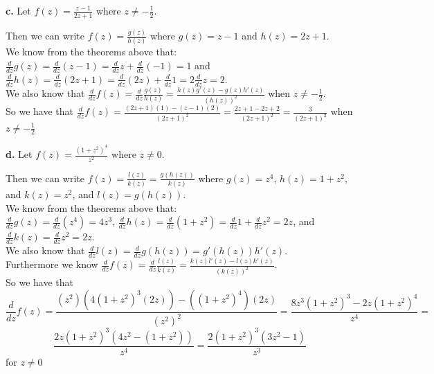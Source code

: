 \documentclass{article}
\begin{document}
{\Large\textbf{c.}} Let $f(z) =\frac{z - 1}{2z + 1}$ where $z\neq -\frac{1}{2}$.
\begin{center}
    \doublespacing
    Then we can write $f(z) =\frac{g(z)}{h(z)}$ where $g(z) = z - 1$ and $h(z) = 2z + 1$.
    \\We know from the theorems above that:
    \\$\frac{d}{dz} g(z) =\frac{d}{dz} (z - 1) =\frac{d}{dz} z +\frac{d}{dz} (-1) = 1$ and $\frac{d}{dz} h(z) =\frac{d}{dz} (2z + 1) =\frac{d}{dz} (2z) +\frac{d}{dz} 1 = 2\frac{d}{dz} z = 2$.
    \\We also know that $\frac{d}{dz} f(z) =\frac{d}{dz}\frac{g(z)}{h(z)} =\frac{h(z) g'(z) - g(z) h'(z)}{(h(z))^2}$ when $z\neq -\frac{1}{2}$.
    \\So we have that $\frac{d}{dz} f(z) =\frac{(2z + 1)(1) - (z - 1)(2)}{(2z + 1)^2} =\frac{2z + 1 - 2z + 2}{(2z + 1)^2} =\frac{3}{(2z + 1)^2}$ when $z\neq -\frac{1}{2}$ \qedsymbol
\end{center}

{\Large\textbf{d.}} Let $f(z) =\frac{(1 + z^2)^4}{z^2}$ where $z\neq 0$.
\begin{center}
    \doublespacing
    Then we can write $f(z) =\frac{l(z)}{k(z)} = \frac{g(h(z))}{k(z)}$ where $g(z) = z^4$, $h(z) = 1 + z^2$, and $k(z) = z^2$, and $l(z) = g(h(z))$.
    \\We know from the theorems above that:
    \\$\frac{d}{dz} g(z) =\frac{d}{dz} (z^4) = 4z^3$, $\frac{d}{dz} h(z) =\frac{d}{dz} (1 + z^2) =\frac{d}{dz} 1 +\frac{d}{dz} z^2 = 2z$, and $\frac{d}{dz} k(z) =\frac{d}{dz} z^2 = 2z$.
    \\We also know that $\frac{d}{dz} l(z) =\frac{d}{dz} g(h(z)) = g'(h(z)) h'(z)$.
    \\Furthermore we know $\frac{d}{dz} f(z) =\frac{d}{dz}\frac{l(z)}{k(z)} =\frac{k(z) l'(z) - l(z) k'(z)}{(k(z))^2}$.
    \\So we have that \[\frac{d}{dz} f(z) =\frac{(z^2)(4(1+z^2)^3 (2z)) - ((1+z^2)^4)(2z)}{(z^2)^2} =\frac{8z^3 (1 + z^2)^3 - 2z (1 + z^2)^4}{z^4} =\]
    \[\frac{2z(1 + z^2)^3(4z^2 - (1 + z^2))}{z^4} =\frac{2(1 + z^2)^3 (3z^2 - 1)}{z^3}\] for $z\neq 0$ \qedsymbol
\end{center}


\newpage
\end{document}
